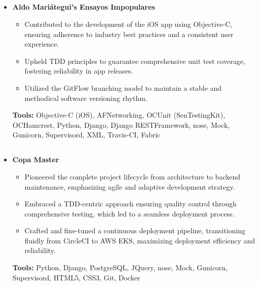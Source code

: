 \documentclass[11pt,a4paper,english]{moderncv}
\begin{document}
\subsection{}

{
\begin{itemize}
    \item \textbf{Aldo Mariátegui’s Ensayos Impopulares}
        \begin{itemize}
            \item Contributed to the development of the iOS app using Objective-C, ensuring adherence to industry best practices and a consistent user experience.
            \item Upheld TDD principles to guarantee comprehensive unit test coverage, fostering reliability in app releases.
            \item Utilized the GitFlow branching model to maintain a stable and methodical software versioning rhythm.
        \end{itemize}
        \textbf{Tools:} Objective-C (iOS), AFNetworking, OCUnit (SenTestingKit), OCHamcrest, Python, Django, Django RESTFramework, nose, Mock, Gunicorn, Supervisord, XML, Travis-CI, Fabric
\end{itemize}
}

\subsection{}

{
\begin{itemize}
    \item \textbf{Copa Master}
        \begin{itemize}
            \item Pioneered the complete project lifecycle from architecture to backend maintenance, emphasizing agile and adaptive development strategy.
            \item Embraced a TDD-centric approach ensuring quality control through comprehensive testing, which led to a seamless deployment process.
            \item Crafted and fine-tuned a continuous deployment pipeline, transitioning fluidly from CircleCI to AWS EKS, maximizing deployment efficiency and reliability.
        \end{itemize}
        \textbf{Tools:} Python, Django, PostgreSQL, JQuery, nose, Mock, Gunicorn, Supervisord, HTML5, CSS3, Git, Docker
\end{itemize}
}
\end{document}

